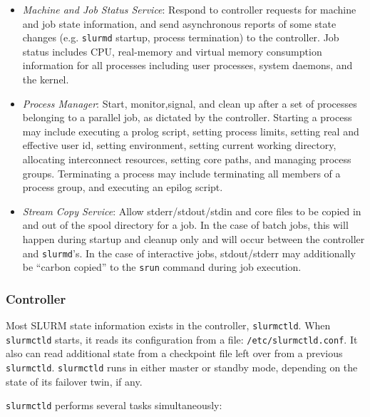 \begin{itemize}
\item {\em Machine and Job Status Service}:  Respond to controller 
requests for machine and job state information, and send asynchronous 
reports of some state changes (e.g. {\tt slurmd} startup, process 
termination) to the controller.
Job status includes CPU, real-memory and virtual memory consumption 
information for all processes including user processes, system daemons, 
and the kernel. 

\item{\em Process Manager}:  Start, monitor,signal, and clean up after
a set of processes belonging to a parallel job, as dictated by the
controller.  Starting a process may include executing a prolog script, 
setting process limits, setting real and effective
user id, setting environment, setting current working directory, allocating 
interconnect resources, setting core paths, and managing process groups.  
Terminating a process may include terminating all members of a process 
group, and executing an epilog script.

\item{\em Stream Copy Service}:  Allow stderr/stdout/stdin and core files
to be copied in and out of the spool directory for a job.  In the case
of batch jobs, this will happen during startup and cleanup only and will
occur between the controller and {\tt slurmd}'s.
In the case of interactive jobs, stdout/stderr may additionally be ``carbon 
copied'' to the {\tt srun} command during job execution.

\end{itemize}

\subsubsection{Controller}

Most SLURM state information exists in the controller, {\tt slurmctld}. 
When {\tt slurmctld} starts, it reads its configuration from a file:
{\tt /etc/slurmctld.conf}.  It also can read additional state from a 
checkpoint file left over from a previous {\tt slurmctld}.
{\tt slurmctld} runs in either master or standby mode, depending
on the state of its failover twin, if any.  

{\tt slurmctld} performs several tasks simultaneously:

